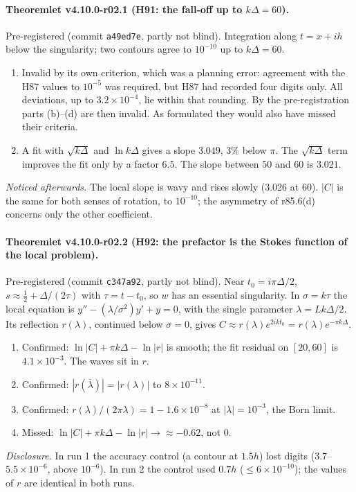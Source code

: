\paragraph{Theoremlet v4.10.0-r02.1 (H91: the fall-off up to \(k\Delta=60\)).}
Pre-registered (commit \texttt{a49ed7e}, partly not blind).  Integration along \(t=x+ih\) below the singularity; two contours agree to
\(10^{-10}\) up to \(k\Delta=60\).
\begin{enumerate}[leftmargin=2em]
\item[(a)] Invalid by its own criterion, which was a planning error: agreement with the H87 values to \(10^{-5}\) was required, but H87 had recorded
four digits only.  All deviations, up to \(3.2\times10^{-4}\), lie within that rounding.  By the pre-registration parts (b)--(d) are then invalid.  As
formulated they would also have missed their criteria.
\item[(b)--(d)] A fit with \(\sqrt{k\Delta}\) and \(\ln k\Delta\) gives a slope \(3.049\), \(3\%\) below \(\pi\).  The \(\sqrt{k\Delta}\) term improves the fit only by a
factor \(6.5\).  The slope between \(50\) and \(60\) is \(3.021\).
\end{enumerate}
\emph{Noticed afterwards.}  The local slope is wavy and rises slowly (\(3.026\) at \(60\)).  \(|C|\) is the same for both senses of rotation, to
\(10^{-10}\); the asymmetry of r85.6(d) concerns only the other coefficient.

\paragraph{Theoremlet v4.10.0-r02.2 (H92: the prefactor is the Stokes function of the local problem).}
Pre-registered (commit \texttt{c347a92}, partly not blind).  Near \(t_0=i\pi\Delta/2\), \(s\approx\tfrac12+\Delta/(2\tau)\) with \(\tau=t-t_0\), so \(w\) has an
essential singularity.  In \(\sigma=k\tau\) the local equation is \(y''-(\lambda/\sigma^2)y'+y=0\), with the single parameter \(\lambda=Lk\Delta/2\).  Its
reflection \(r(\lambda)\), continued below \(\sigma=0\), gives \(C\approx r(\lambda)e^{2ikt_0}=r(\lambda)e^{-\pi k\Delta}\).
\begin{enumerate}[leftmargin=2em]
\item[(b)] Confirmed: \(\ln|C|+\pi k\Delta-\ln|r|\) is smooth; the fit residual on \([20,60]\) is \(4.1\times10^{-3}\).  The waves sit in \(r\).
\item[(c)] Confirmed: \(|r(\bar\lambda)|=|r(\lambda)|\) to \(8\times10^{-11}\).
\item[(d)] Confirmed: \(r(\lambda)/(2\pi\lambda)=1-1.6\times10^{-8}\) at \(|\lambda|=10^{-3}\), the Born limit.
\item[(a)] Missed: \(\ln|C|+\pi k\Delta-\ln|r|\to\approx-0.62\), not \(0\).
\end{enumerate}
\emph{Disclosure.}  In run 1 the accuracy control (a contour at \(1.5h\)) lost digits (\(3.7\)--\(5.5\times10^{-6}\), above \(10^{-6}\)).  In run 2 the control
used \(0.7h\) (\(\le6\times10^{-10}\)); the values of \(r\) are identical in both runs.

